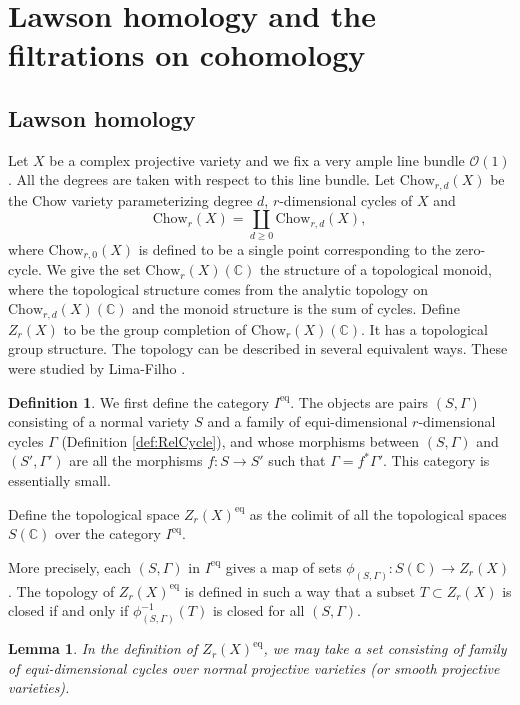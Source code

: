 \documentclass{amsart}
\newtheorem{lem}[theorem]{Lemma}
\theoremstyle{definition}
\newtheorem{defn}[theorem]{Definition}
\theoremstyle{remark}
\newcommand{\mbb}{\mathbb}
\newcommand{\CC}{\mbb{C}}
\newcommand{\mc}{\mathcal}
\newcommand{\OO}{\mc{O}}
\newcommand{\eq}{\text{eq}}
\newcommand{\ch}{\text{Chow}}
\begin{document}
\section{Lawson homology and the filtrations on cohomology}\label{sec:complex}
\subsection{Lawson homology}
Let $X$ be a complex projective variety and we fix a very ample line bundle $\OO(1)$.
All the degrees are taken with respect to this line bundle.
Let $\ch_{r, d}(X)$ be the Chow variety parameterizing degree $d$, $r$-dimensional cycles of $X$ and 
\[
\ch_r(X)=\coprod_{d\geq 0} \ch_{r, d}(X),
\]
where $\ch_{r, 0}(X)$ is defined to be a single point corresponding to the  zero-cycle.
We give the set $\ch_r(X)(\CC)$ the structure of a topological monoid, where the topological structure comes from the analytic topology on $\ch_{r, d}(X)(\CC)$ and the monoid structure is the sum of cycles.
Define $Z_r(X)$ to be the group completion of $\ch_r(X)(\CC)$.
It has a topological group structure. 
The topology can be described in several equivalent ways.
These were studied by Lima-Filho \cite{LF_fl_eq_chow}.





\begin{defn}\label{def:eq}
We first define the category $I^\eq$. The objects are pairs $(S, \Gamma)$ consisting of a normal variety $S$ and a family of equi-dimensional $r$-dimensional cycles $\Gamma$ (Definition \ref{def:RelCycle}), and whose morphisms between $(S, \Gamma)$ and $(S', \Gamma')$ are all the morphisms $f: S \to S'$ such that $\Gamma=f^*\Gamma'$. This category is essentially small.

Define the topological space $Z_r(X)^\eq$ as the colimit of all the topological spaces $S(\CC)$ over the category $I^\eq$.

More precisely, each $(S, \Gamma)$ in $I^\eq$ gives a map of sets $\phi_{(S, \Gamma)}: S(\CC) \to Z_r(X)$. The topology of $Z_r(X)^\eq$ is defined in such a way that a subset $T \subset Z_r(X)$ is closed if and only if $\phi_{(S, \Gamma)}^{-1}(T)$ is closed for all $(S, \Gamma)$.
\end{defn}


\begin{lem}\label{lem:smproj}
In the definition of $ Z_r(X)^\eq$, we may take a set consisting of family of equi-dimensional cycles over normal projective varieties  (or smooth projective varieties).
\end{lem}
\end{document}
